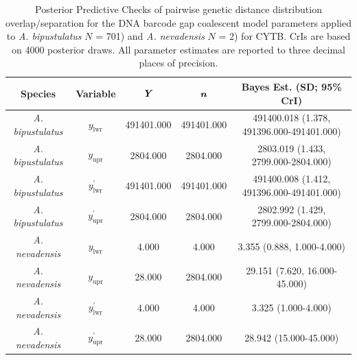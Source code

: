 \documentclass[12pt]{article}
\begin{document}
\begin{landscape}
\begin{table}[H]

\centering

\caption{Posterior Predictive Checks of pairwise genetic distance distribution overlap/separation for the DNA barcode gap coalescent model parameters applied to \textit{A. bipustulatus} $N$ = 701) and \textit{A. nevadensis} $N$ = 2) for CYTB. CrIs are based on 4000 posterior draws. All parameter estimates are reported to three decimal places of precision.}

\begin{tabular}{ccccc} \hline

\textbf{Species} & \textbf{Variable} & $\textbf{\textit{Y}}$ & $\textbf{\textit{n}}$ & \textbf{Bayes Est. (SD; 95\% CrI)} \\  \hline

\textit{A. bipustulatus} & $y_\mathrm{lwr}$ & 491401.000 & 491401.000 & 491400.018 (1.378, 491396.000-491401.000) \\
\textit{A. bipustulatus} & $y_\mathrm{upr}$ & 2804.000 & 2804.000 & 2803.019 (1.433, 2799.000-2804.000) \\
\textit{A. bipustulatus} & $y^{'}_\mathrm{lwr}$ & 491401.000 & 491401.000 & 491400.008 (1.412, 491396.000-491401.000) \\
\textit{A. bipustulatus} & $y^{'}_\mathrm{upr}$ & 2804.000 & 2804.000 & 2802.992 (1.429, 2799.000-2804.000) \\

\textit{A. nevadensis} & $y_\mathrm{lwr}$ & 4.000 & 4.000 & 3.355 (0.888, 1.000-4.000) \\
\textit{A. nevadensis} & $y_\mathrm{upr}$ & 28.000 & 2804.000 & 29.151 (7.620, 16.000-45.000) \\
\textit{A. nevadensis} & $y^{'}_\mathrm{lwr}$ & 4.000 & 4.000 & 3.325 (1.000-4.000) \\
\textit{A. nevadensis} & $y^{'}_\mathrm{upr}$ & 28.000 & 2804.000 & 28.942 (15.000-45.000)  \\


\hline


\end{tabular}

\end{table}
\end{landscape}

\newpage
\end{document}
